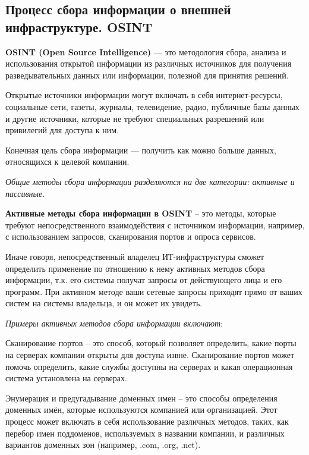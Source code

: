 	\subsection{Процесс сбора информации о внешней инфраструктуре. OSINT}
	
	\par \textbf{OSINT (Open Source Intelligence)} — это методология сбора, анализа и использования открытой информации из различных источников для получения разведывательных данных или информации, полезной для принятия решений.
	
	\par Открытые источники информации могут включать в себя интернет-ресурсы, социальные сети, газеты, журналы, телевидение, радио, публичные базы данных и другие источники, которые не требуют специальных разрешений или привилегий для доступа к ним.
	
	\par Конечная цель сбора информации — получить как можно больше данных, относящихся к целевой компании.
	
	\par \textit{Общие методы сбора информации разделяются на две категории: активные и пассивные.}
	
	\par \textbf{Активные методы сбора информации в OSINT} – это методы, которые требуют непосредственного взаимодействия с источником информации, например, с использованием запросов, сканирования портов и опроса сервисов.
	
	\par Иначе говоря, непосредственный владелец ИТ-инфраструктуры сможет определить применение по отношению к нему активных методов сбора информации, т.к. его системы получат запросы от действующего лица и его программ. При активном методе ваши сетевые запросы приходят прямо от ваших систем на системы владельца, и он может их увидеть.
	
	\par \textit{Примеры активных методов сбора информации включают}:
	
	\par Сканирование портов – это способ, который позволяет определить, какие порты на серверах компании открыты для доступа извне. Сканирование портов может помочь определить, какие службы доступны на серверах и какая операционная система установлена на серверах.
	
	\par Энумерация и предугадывание доменных имен – это способы определения доменных имён, которые используются компанией или организацией. Этот процесс может включать в себя использование различных методов, таких, как перебор имен поддоменов, используемых в названии компании, и различных вариантов доменных зон (например, .com, .org, .net).
	
